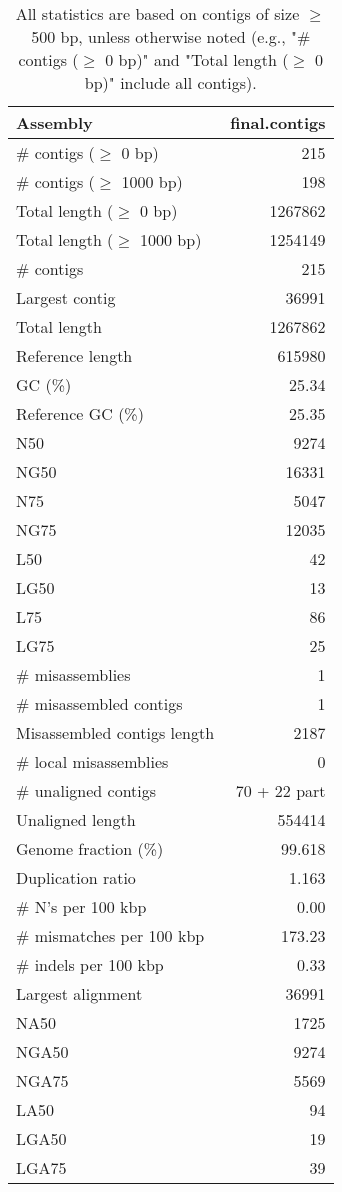 \documentclass[12pt,a4paper]{article}
\begin{document}
\begin{table}[ht]
\begin{center}
\caption{All statistics are based on contigs of size $\geq$ 500 bp, unless otherwise noted (e.g., "\# contigs ($\geq$ 0 bp)" and "Total length ($\geq$ 0 bp)" include all contigs).}
\begin{tabular}{|l*{1}{|r}|}
\hline
Assembly & final.contigs \\ \hline
\# contigs ($\geq$ 0 bp) & 215 \\ \hline
\# contigs ($\geq$ 1000 bp) & 198 \\ \hline
Total length ($\geq$ 0 bp) & 1267862 \\ \hline
Total length ($\geq$ 1000 bp) & 1254149 \\ \hline
\# contigs & 215 \\ \hline
Largest contig & 36991 \\ \hline
Total length & 1267862 \\ \hline
Reference length & 615980 \\ \hline
GC (\%) & 25.34 \\ \hline
Reference GC (\%) & 25.35 \\ \hline
N50 & 9274 \\ \hline
NG50 & 16331 \\ \hline
N75 & 5047 \\ \hline
NG75 & 12035 \\ \hline
L50 & 42 \\ \hline
LG50 & 13 \\ \hline
L75 & 86 \\ \hline
LG75 & 25 \\ \hline
\# misassemblies & 1 \\ \hline
\# misassembled contigs & 1 \\ \hline
Misassembled contigs length & 2187 \\ \hline
\# local misassemblies & 0 \\ \hline
\# unaligned contigs & 70 + 22 part \\ \hline
Unaligned length & 554414 \\ \hline
Genome fraction (\%) & 99.618 \\ \hline
Duplication ratio & 1.163 \\ \hline
\# N's per 100 kbp & 0.00 \\ \hline
\# mismatches per 100 kbp & 173.23 \\ \hline
\# indels per 100 kbp & 0.33 \\ \hline
Largest alignment & 36991 \\ \hline
NA50 & 1725 \\ \hline
NGA50 & 9274 \\ \hline
NGA75 & 5569 \\ \hline
LA50 & 94 \\ \hline
LGA50 & 19 \\ \hline
LGA75 & 39 \\ \hline
\end{tabular}
\end{center}
\end{table}
\end{document}
